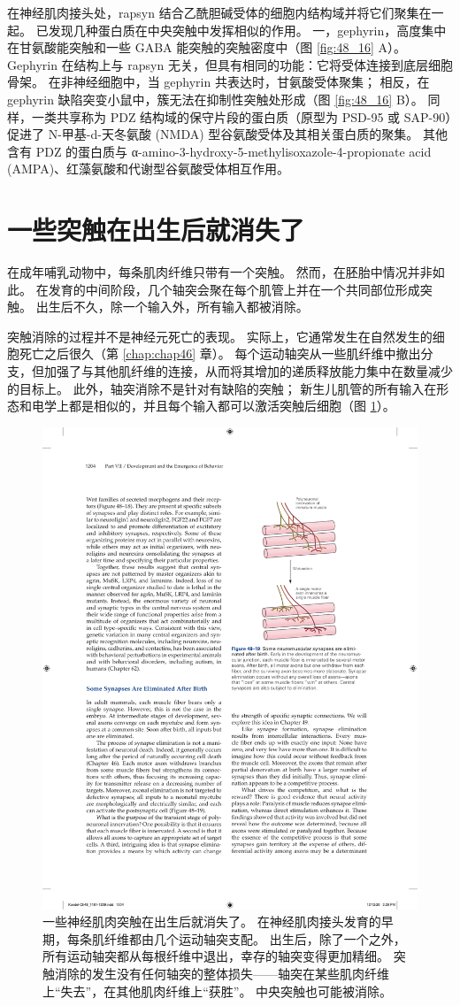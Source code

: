 在神经肌肉接头处，rapsyn 结合乙酰胆碱受体的细胞内结构域并将它们聚集在一起。 已发现几种蛋白质在中央突触中发挥相似的作用。 一，gephyrin，高度集中在甘氨酸能突触和一些 GABA 能突触的突触密度中（图 \ref{fig:48_16} A）。 Gephyrin 在结构上与 rapsyn 无关，但具有相同的功能：它将受体连接到底层细胞骨架。 在非神经细胞中，当 gephyrin 共表达时，甘氨酸受体聚集； 相反，在 gephyrin 缺陷突变小鼠中，簇无法在抑制性突触处形成（图 \ref{fig:48_16} B）。 同样，一类共享称为 PDZ 结构域的保守片段的蛋白质（原型为 PSD-95 或 SAP-90）促进了 N-甲基-d-天冬氨酸 (NMDA) 型谷氨酸受体及其相关蛋白质的聚集。 其他含有 PDZ 的蛋白质与 α-amino-3-hydroxy-5-methylisoxazole-4-propionate acid (AMPA)、红藻氨酸和代谢型谷氨酸受体相互作用。


\section{一些突触在出生后就消失了}

在成年哺乳动物中，每条肌肉纤维只带有一个突触。 然而，在胚胎中情况并非如此。 在发育的中间阶段，几个轴突会聚在每个肌管上并在一个共同部位形成突触。 出生后不久，除一个输入外，所有输入都被消除。

突触消除的过程并不是神经元死亡的表现。 实际上，它通常发生在自然发生的细胞死亡之后很久（第 \ref{chap:chap46} 章）。 每个运动轴突从一些肌纤维中撤出分支，但加强了与其他肌纤维的连接，从而将其增加的递质释放能力集中在数量减少的目标上。 
此外，轴突消除不是针对有缺陷的突触； 新生儿肌管的所有输入在形态和电学上都是相似的，并且每个输入都可以激活突触后细胞（图 \ref{fig:48_19}）。

\begin{figure}[htbp]
	\centering
	\includegraphics[width=0.4\linewidth]{chap48/fig_48_19}
	\caption{一些神经肌肉突触在出生后就消失了。 在神经肌肉接头发育的早期，每条肌纤维都由几个运动轴突支配。 出生后，除了一个之外，所有运动轴突都从每根纤维中退出，幸存的轴突变得更加精细。 突触消除的发生没有任何轴突的整体损失——轴突在某些肌肉纤维上“失去”，在其他肌肉纤维上“获胜”。 中央突触也可能被消除。}
	\label{fig:48_19}
\end{figure}

